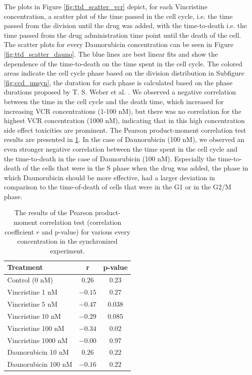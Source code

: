 \documentclass[pdftex,12pt,a4paper]{report}
\begin{document}
The plots in Figure \ref{fig:ttd_scatter_vcr} depict, for each Vincristine concentration, a scatter plot of the time passed in the cell cycle, i.e. the time passed from the division until the drug was added, with the time-to-death i.e. the time passed from the drug administration time point until the death of the cell. The scatter plots for every Daunorubicin concentration can be seen in Figure \ref{fig:ttd_scatter_dauno}.  The blue lines are best linear fits and show the dependence of the time-to-death on the time spent in the cell cycle. The colored areas indicate the cell cycle phase based on the division distribution in Subfigure \ref{fig:ccd_unsyn}, the duration for each phase is calculated based on the phase durations proposed by T. S. Weber et al. \cite{weber2014quantifying}. We observed a negative correlation between the time in the cell cycle and the death time, which increased for increasing VCR concentrations (1-100 nM), but there was no correlation for the highest VCR concentration (1000 nM), indicating that in this high concentration side effect toxicities are prominent. The Pearson product-moment correlation test results are presented in \ref{table:unsyn_ttd_r_p}. In the case of Daunorubicin (100 nM), we observed an even stronger negative correlation between the time spent in the cell cycle and the time-to-death in the case of Daunorubicin (100 nM). Especially the time-to-death of the cells that were in the S phase when the drug was added, the phase in which Daunorubicin should be more effective, had a larger deviation in comparison to the time-of-death of cells that were in the G1 or in the G2/M phase.

\begin{table}[H]
\centering
\begin{tabular}{ l | c | c}
\hline
Treatment & r & p-value \\
\hline\hline
Control (0 nM) & $0.26$ & $0.23$ \\
Vincristine 1 nM & $-0.15$ & $0.27$ \\
Vincristine 5 nM & $-0.47$ & $0.038$ \\
Vincristine 10  nM & $-0.29$ & $0.085$ \\
Vincristine 100 nM & $-0.34$ & $0.02$ \\
Vincristine 1000 nM & $-0.00$ & $0.97$ \\
\hline
Daunorubicin 10 nM & $0.26$ & $0.22$ \\
Daunorubicin 100 nM & $-0.16$ & $0.22$ \\
\end{tabular}
\caption{The results of the Pearson product-moment correlation test (correlation coefficient $r$ and p-value) for various every concentration in the synchronized experiment.}
\label{table:unsyn_ttd_r_p}
\end{table}
\end{document}

